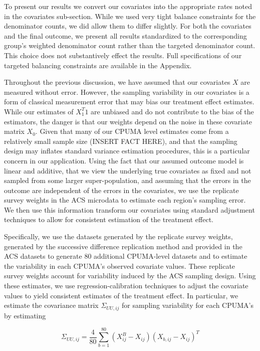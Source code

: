 \documentclass[12pt]{article}
\begin{document}
To present our results we convert our covariates into the appropriate rates noted in the covariates sub-section. While we used very tight balance constraints for the denominator counts, we did allow them to differ slightly. For both the covariates and the final outcome, we present all results standardized to the corresponding group's weighted denominator count rather than the targeted denominator count. This choice does not substantively effect the results. Full specifications of our targeted balancing constraints are available in the Appendix.

Throughout the previous discussion, we have assumed that our covariates $X$ are measured without error. However, the sampling variability in our covariates is a form of classical measurement error that may bias our treatment effect estimates. While our estimates of $X_1^T1$ are unbiased and do not contribute to the bias of the estimators, the danger is that our weights depend on the noise in these covariate matrix $X_0$. Given that many of our CPUMA level estimates come from a relatively small sample size (INSERT FACT HERE), and that the sampling design may inflates standard variance estimation procedures, this is a particular concern in our application. Using the fact that our assumed outcome model is linear and additive, that we view the underlying true covariates as fixed and not sampled from some larger super-population, and assuming that the errors in the outcome are independent of the errors in the covariates, we use the replicate survey weights in the ACS microdata to estimate each region's sampling error. We then use this information transform our covariates using standard adjustment techniques to allow for consistent estimation of the treatment effect.

Specifically, we use the datasets generated by the replicate survey weights, generated by the successive difference replication method and provided in the ACS datasets to generate 80 additional CPUMA-level datasets and to estimate the variability in each CPUMA's observed covariate values. These replicate survey weights account for variability induced by the ACS sampling design. Using these estimates, we use regression-calibration techniques to adjust the covariate values to yield consistent estimates of the treatment effect. In particular, we estimate the covariance matrix $\Sigma_{UU, ij}$ for sampling variability for each CPUMA's by estimating

$$
\Sigma_{UU, ij} = \frac{4}{80}\sum_{b=1}^80(X_{ij}^B - X_{ij})(X_{b, ij} - X_{ij})^T
$$
\end{document}
